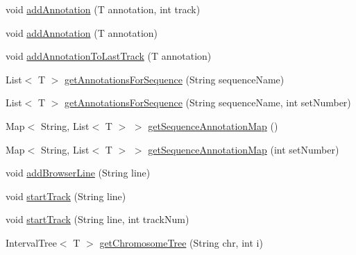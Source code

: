 \begin{DoxyCompactItemize}
\item 
void \hyperlink{classbroad_1_1core_1_1annotation_1_1_annotation_reader_3_01_t_01extends_01_genomic_annotation_01_4_a2e58068f93f16900ce7b38feb840dcd8}{add\+Annotation} (T annotation, int track)
\item 
void \hyperlink{classbroad_1_1core_1_1annotation_1_1_annotation_reader_3_01_t_01extends_01_genomic_annotation_01_4_a0262e1929a493adf30b78b7db8f61035}{add\+Annotation} (T annotation)
\item 
void \hyperlink{classbroad_1_1core_1_1annotation_1_1_annotation_reader_3_01_t_01extends_01_genomic_annotation_01_4_a4ce9be2e3fd0505b9276c96f18505638}{add\+Annotation\+To\+Last\+Track} (T annotation)
\item 
List$<$ T $>$ \hyperlink{classbroad_1_1core_1_1annotation_1_1_annotation_reader_3_01_t_01extends_01_genomic_annotation_01_4_ad15cb7da92cfed836d3e012b5301efb7}{get\+Annotations\+For\+Sequence} (String sequence\+Name)
\item 
List$<$ T $>$ \hyperlink{classbroad_1_1core_1_1annotation_1_1_annotation_reader_3_01_t_01extends_01_genomic_annotation_01_4_a6f34387deb274c9ba2a02f825bf58c0d}{get\+Annotations\+For\+Sequence} (String sequence\+Name, int set\+Number)
\item 
Map$<$ String, List$<$ T $>$ $>$ \hyperlink{classbroad_1_1core_1_1annotation_1_1_annotation_reader_3_01_t_01extends_01_genomic_annotation_01_4_a97f1a2884828d396023843755147022f}{get\+Sequence\+Annotation\+Map} ()
\item 
Map$<$ String, List$<$ T $>$ $>$ \hyperlink{classbroad_1_1core_1_1annotation_1_1_annotation_reader_3_01_t_01extends_01_genomic_annotation_01_4_ae106c83d07b6598b7dd359fcc026e8fd}{get\+Sequence\+Annotation\+Map} (int set\+Number)
\item 
void \hyperlink{classbroad_1_1core_1_1annotation_1_1_annotation_reader_3_01_t_01extends_01_genomic_annotation_01_4_abe2f553364ca9fb66ab5f8b71c027c6c}{add\+Browser\+Line} (String line)
\item 
void \hyperlink{classbroad_1_1core_1_1annotation_1_1_annotation_reader_3_01_t_01extends_01_genomic_annotation_01_4_aa00450ca475b57a755c24fcb06d7c7cf}{start\+Track} (String line)
\item 
void \hyperlink{classbroad_1_1core_1_1annotation_1_1_annotation_reader_3_01_t_01extends_01_genomic_annotation_01_4_a7e5e29800f6c76b42b51b626d4e919fe}{start\+Track} (String line, int track\+Num)
\item 
Interval\+Tree$<$ T $>$ \hyperlink{classbroad_1_1core_1_1annotation_1_1_annotation_reader_3_01_t_01extends_01_genomic_annotation_01_4_afee522dcd0f10dd65290b9dea988ecca}{get\+Chromosome\+Tree} (String chr, int i)

\end{DoxyCompactItemize}

